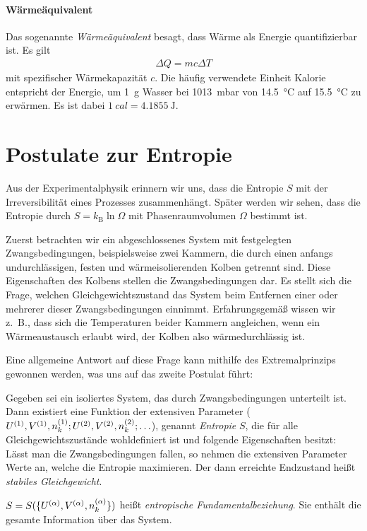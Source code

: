\paragraph*{Wärmeäquivalent}

Das sogenannte \emph{Wärmeäquivalent} besagt, dass Wärme als Energie quantifizierbar ist. Es gilt
\begin{align*}
    \Delta Q = mc\Delta T
\end{align*}
mit spezifischer Wärmekapazität $c$.
Die häufig verwendete Einheit Kalorie entspricht der Energie, um \qty{1}{\g} Wasser bei \qty{1013}{\milli\bar} von \qty{14,5}{\degreeCelsius} auf \qty{15,5}{\degreeCelsius} zu erwärmen. Es ist dabei $\qty{1}{cal} = \qty{4,1855}{\joule}$.



\section{Postulate zur Entropie}

Aus der Experimentalphysik erinnern wir uns, dass die Entropie $S$ mit der Irreversibilität eines Prozesses zusammenhängt. Später werden wir sehen, dass die Entropie durch $S=k_\mathrm{B}\ln{\Omega}$ mit Phasenraumvolumen $\Omega$ bestimmt ist.

Zuerst betrachten wir ein abgeschlossenes System mit festgelegten Zwangsbedingungen, beispielsweise zwei Kammern, die durch einen anfangs undurchlässigen, festen und wärmeisolierenden Kolben getrennt sind. Diese Eigenschaften des Kolbens stellen die Zwangsbedingungen dar. Es stellt sich die Frage, welchen Gleichgewichtszustand das System beim Entfernen einer oder mehrerer dieser Zwangsbedingungen einnimmt. Erfahrungsgemäß wissen wir z.~B., dass sich die Temperaturen beider Kammern angleichen, wenn ein Wärmeaustausch erlaubt wird, der Kolben also wärmedurchlässig ist.

Eine allgemeine Antwort auf diese Frage kann mithilfe des Extremalprinzips gewonnen werden, was uns auf das zweite Postulat führt:

\begin{postulate}
    \label{post:entropie_maximierung}
    Gegeben sei ein isoliertes System, das durch Zwangsbedingungen unterteilt ist. Dann existiert eine Funktion der extensiven Parameter ($U^{(1)},V^{(1)},n_k^{(1)};U^{(2)},V^{(2)},n_k^{(2)}; \ldots$), genannt \emph{Entropie} $S$, die für alle Gleichgewichtszustände wohldefiniert ist und folgende Eigenschaften besitzt: Lässt man die Zwangsbedingungen fallen, so nehmen die extensiven Parameter Werte an, welche die Entropie maximieren. Der dann erreichte Endzustand heißt \emph{stabiles Gleichgewicht}.

    $S=S(\{U^{(\alpha)},V^{(\alpha)},n_k^{(\alpha)}\})$ heißt \emph{entropische Fundamentalbeziehung}. Sie enthält die gesamte Information über das System.
\end{postulate}


